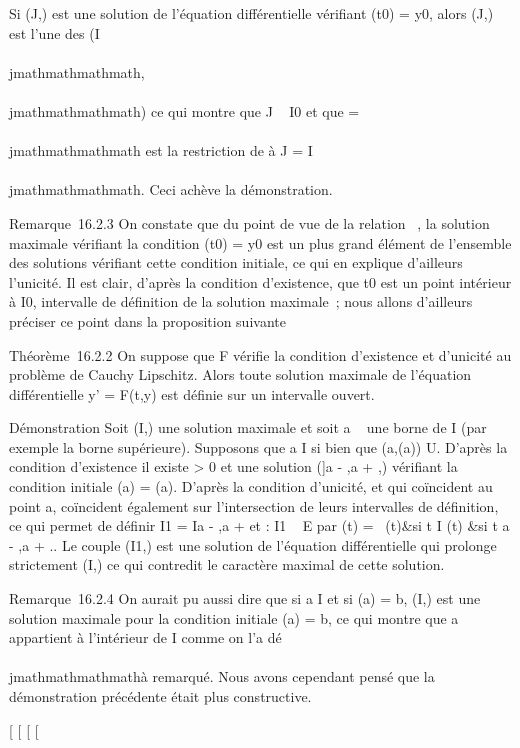 Si (J,\psi) est une solution de l'équation différentielle vérifiant
\psi(t0) = y0, alors (J,\psi) est l'une des
(I\\\\jmathmathmathmath,\psi\\\\jmathmathmathmath) ce qui montre que J \subset~ I0 et que \psi
= \psi\\\\jmathmathmathmath est la restriction de  à J = I\\\\jmathmathmathmath.
Ceci achève la démonstration.

Remarque~16.2.3 On constate que du point de vue de la relation \prec~, la
solution maximale vérifiant la condition (t0) =
y0 est un plus grand élément de l'ensemble des solutions
vérifiant cette condition initiale, ce qui en explique d'ailleurs
l'unicité. Il est clair, d'après la condition d'existence, que
t0 est un point intérieur à I0, intervalle de
définition de la solution maximale~; nous allons d'ailleurs préciser ce
point dans la proposition suivante

Théorème~16.2.2 On suppose que F vérifie la condition d'existence et
d'unicité au problème de Cauchy Lipschitz. Alors toute solution maximale
de l'équation différentielle y' = F(t,y) est définie sur un intervalle
ouvert.

Démonstration Soit (I,\phi) une solution maximale et soit a
\in\overline{}~ une borne de I (par exemple la borne
supérieure). Supposons que a \in I si bien que (a,\phi(a)) \in U. D'après la
condition d'existence il existe \eta \textgreater{} 0 et une solution ({]}a
- \eta,a + \eta{[},\psi) vérifiant la condition initiale \psi(a) = \phi(a). D'après la
condition d'unicité, \phi et \psi qui coïncident au point a, coïncident
également sur l'intersection de leurs intervalles de définition, ce qui
permet de définir I1 = I\cup{]}a - \eta,a + \eta{[} et  :
I1 \rightarrow~ E par (t) = \left
\ \cases {}(t)&si t \in I
\cr \psi(t) &si t \in{]}a - \eta,a + \eta{[} 
\right .. Le couple (I1,) est une
solution de l'équation différentielle qui prolonge strictement (I,\phi) ce
qui contredit le caractère maximal de cette solution.

Remarque~16.2.4 On aurait pu aussi dire que si a \in I et si \phi(a) = b,
(I,\phi) est une solution maximale pour la condition initiale \phi(a) = b, ce
qui montre que a appartient à l'intérieur de I comme on l'a dé\\\\jmathmathmathmathà
remarqué. Nous avons cependant pensé que la démonstration précédente
était plus constructive.

{[}
{[}
{[}
{[}
